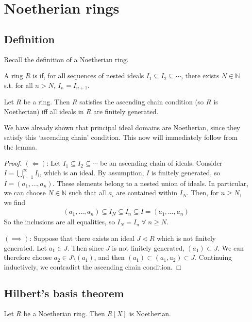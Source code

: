\section{Noetherian rings}

\subsection{Definition}
Recall the definition of a Noetherian ring.
\begin{definition}
	A ring $R$ is  if, for all sequences of nested ideals $I_1 \subseteq I_2 \subseteq \cdots$, there exists $N \in \mathbb N$ s.t. for all $n > N$, $I_n = I_{n+1}$.
\end{definition}

\begin{lemma}
	Let $R$ be a ring.
	Then $R$ satisfies the ascending chain condition (so $R$ is Noetherian) iff all ideals in $R$ are finitely generated.
\end{lemma}

We have already shown that principal ideal domains are Noetherian, since they satisfy this `ascending chain' condition.
This now will immediately follow from the lemma.

\begin{proof}
	$(\Longleftarrow)$: Let $I_1 \subseteq I_2 \subseteq \cdots$ be an ascending chain of ideals.
	Consider $I = \bigcup_{i=1}^\infty I_i$, which is an ideal.
	By assumption, $I$ is finitely generated, so $I = (a_1, \dots, a_n)$.
	These elements belong to a nested union of ideals.
	In particular, we can choose $N \in \mathbb N$ such that all $a_i$ are contained within $I_N$.
	Then, for $n \geq N$, we find
	\begin{align*}
		(a_1, \dots, a_n) \subseteq I_N \subseteq I_n \subseteq I = (a_1, \dots, a_n)
	\end{align*}
	So the inclusions are all equalities, so $I_N = I_n \; \forall \; n \geq N$.

	$(\implies)$: Suppose that there exists an ideal $J \triangleleft R$ which is not finitely generated.
	Let $a_1 \in J$.
	Then since $J$ is not finitely generated, $(a_1) \subset J$.
	We can therefore choose $a_2 \in J \setminus (a_1)$, and then $(a_1) \subset (a_1, a_2) \subset J$.
	Continuing inductively, we contradict the ascending chain condition.
\end{proof}

\subsection{Hilbert's basis theorem}
\begin{theorem}
	Let $R$ be a Noetherian ring.
	Then $R[X]$ is Noetherian.
\end{theorem}

